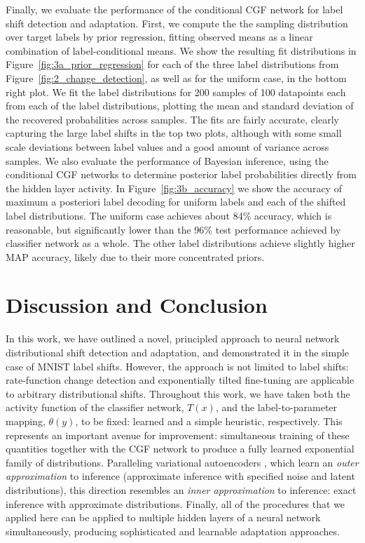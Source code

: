 \documentclass{article}      %
\begin{document}
Finally, we evaluate the performance of the conditional CGF network for label shift detection and adaptation.
First, we compute the the sampling distribution over target labels by prior regression, fitting observed means as a linear combination of label-conditional means.
We show the resulting fit distributions in Figure~\ref{fig:3a_prior_regression} for each of the three label distributions from Figure~\ref{fig:2_change_detection}, as well as for the uniform case, in the bottom right plot.
We fit the label distributions for 200 samples of 100 datapoints each from each of the label distributions, plotting the mean and standard deviation of the recovered probabilities across samples. 
The fits are fairly accurate, clearly capturing the large label shifts in the top two plots, although with some small scale deviations between label values and a good amount of variance across samples.
We also evaluate the performance of Bayesian inference, using the conditional CGF networks to determine posterior label probabilities directly from the hidden layer activity. 
In Figure~\ref{fig:3b_accuracy} we show the accuracy of maximum a posteriori label decoding for uniform labels and each of the shifted label distributions.
The uniform case achieves about 84\% accuracy, which is reasonable, but significantly lower than the 96\% test performance achieved by classifier network as a whole.
The other label distributions achieve slightly higher MAP accuracy, likely due to their more concentrated priors.


\section{Discussion and Conclusion}

In this work, we have outlined a novel, principled approach to neural network distributional shift detection and adaptation, and demonstrated it in the simple case of MNIST label shifts.
However, the approach is not limited to label shifts: rate-function change detection and exponentially tilted fine-tuning are applicable to arbitrary distributional shifts.
Throughout this work, we have taken both the activity function of the classifier network, $T(x)$, and the label-to-parameter mapping, $\theta(y)$, to be fixed: learned and a simple heuristic, respectively.
This represents an important avenue for improvement: simultaneous training of these quantities together with the CGF network to produce a fully learned exponential family of distributions.
Paralleling variational autoencoders \cite{kingma_auto-encoding_2013}, which learn an \textit{outer approximation} to inference (approximate inference with specified noise and latent distributions), this direction resembles an \textit{inner approximation} to inference: exact inference with approximate distributions.
Finally, all of the procedures that we applied here can be applied to multiple hidden layers of a neural network simultaneously, producing sophisticated and learnable adaptation approaches.
\end{document}
